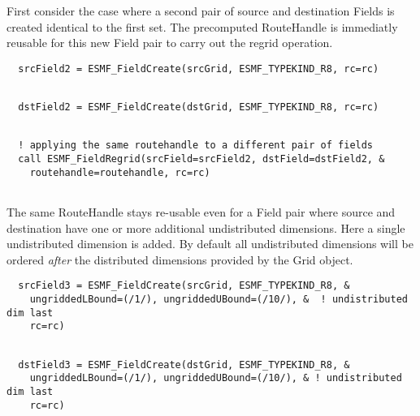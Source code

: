    First consider the case where a second pair of source and destination Fields
   is created identical to the first set. The precomputed RouteHandle is 
   immediatly reusable for this new Field pair to carry out the regrid operation. 

 \begin{verbatim}
  srcField2 = ESMF_FieldCreate(srcGrid, ESMF_TYPEKIND_R8, rc=rc)
 
\end{verbatim}
 

 \begin{verbatim}
  dstField2 = ESMF_FieldCreate(dstGrid, ESMF_TYPEKIND_R8, rc=rc)
 
\end{verbatim}
 

 \begin{verbatim}
  ! applying the same routehandle to a different pair of fields
  call ESMF_FieldRegrid(srcField=srcField2, dstField=dstField2, &
    routehandle=routehandle, rc=rc)
 
\end{verbatim}
 

   The same RouteHandle stays re-usable even for a Field pair where source and 
   destination have one or more additional undistributed dimensions. Here a
   single undistributed dimension is added. By default all undistributed 
   dimensions will be ordered {\em after} the distributed dimensions provided
   by the Grid object.  

 \begin{verbatim}
  srcField3 = ESMF_FieldCreate(srcGrid, ESMF_TYPEKIND_R8, &
    ungriddedLBound=(/1/), ungriddedUBound=(/10/), &  ! undistributed dim last
    rc=rc)
 
\end{verbatim}
 

 \begin{verbatim}
  dstField3 = ESMF_FieldCreate(dstGrid, ESMF_TYPEKIND_R8, &
    ungriddedLBound=(/1/), ungriddedUBound=(/10/), & ! undistributed dim last
    rc=rc)
 
\end{verbatim}
 
